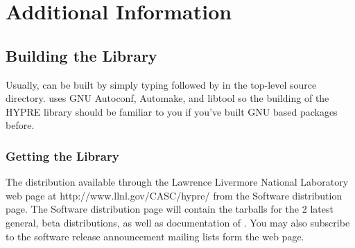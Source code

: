 \chapter{Additional Information}


\section{Building the Library}

Usually, \hypre{} can be built by simply typing 
followed by  in the top-level source directory.
\hypre{} uses GNU Autoconf, Automake, and libtool so the building 
of the HYPRE library should be familiar to you if you've built GNU
based packages before.

\subsection{Getting the Library}
The \hypre{} distribution available through the Lawrence Livermore 
National Laboratory \hypre{} web page at
{http://www.llnl.gov/CASC/hypre/} from the Software distribution page. 
The \hypre{} Software distribution page will contain the tarballs for the 2
latest general, beta distributions, as well as documentation of \hypre{}. 
You may also subscribe to the \hypre{} software release announcement mailing 
lists form the \hypre{} web page.

